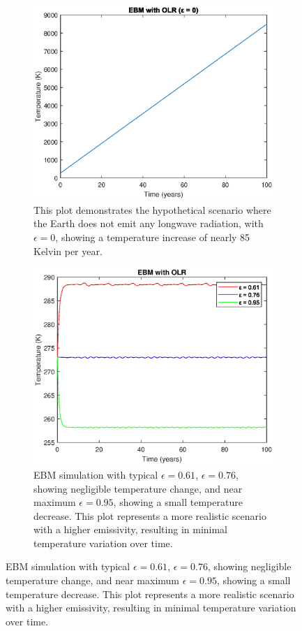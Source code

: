 \documentclass[12pt]{article}
\begin{document}
\begin{figure}[ht]
    \centering
    \begin{subfigure}[b]{\textwidth}
        \centering
        \includegraphics[width=\textwidth]{ebm_with_olr_0.eps}
            \caption{This plot demonstrates the hypothetical scenario 
            where the Earth does not emit any longwave radiation,
             with $\epsilon=0$, 
            showing a temperature increase of nearly 85 Kelvin per year. }
        \label{fig:sub1}
    \end{subfigure}

    \newpage
    
    \hfill %
    \begin{subfigure}[b]{\textwidth}
        \centering
        \includegraphics[width=\textwidth]{ebm_with_diff_olrs.eps}
        \caption{EBM simulation with typical $\epsilon=0.61$,
        $\epsilon=0.76$, 
        showing negligible temperature change,
        and near maximum $\epsilon=0.95$, 
        showing a small temperature decrease. 
        This plot represents a more realistic scenario 
        with a higher emissivity, 
        resulting in minimal temperature variation over time.}


\end{subfigure}
\end{figure}
\end{document}
